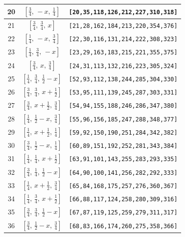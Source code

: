 \documentclass[fleqn,8pt]{jsarticle}
\begin{document}
\begin{longtable}{ccc}
20 & $\left[ \frac{3}{4},\, - x,\, \frac{1}{4} \right]$ & {\tt [20,35,118,126,212,227,310,318]} \\ \hline
21 & $\left[ \frac{3}{4},\, \frac{3}{4},\, x \right]$ & {\tt [21,28,162,184,213,220,354,376]} \\ \hline
22 & $\left[ \frac{1}{4},\, - x,\, \frac{3}{4} \right]$ & {\tt [22,30,116,131,214,222,308,323]} \\ \hline
23 & $\left[ \frac{1}{4},\, \frac{3}{4},\, - x \right]$ & {\tt [23,29,163,183,215,221,355,375]} \\ \hline
24 & $\left[ \frac{3}{4},\, x,\, \frac{3}{4} \right]$ & {\tt [24,31,113,132,216,223,305,324]} \\ \hline
25 & $\left[ \frac{1}{4},\, \frac{3}{4},\, \frac{1}{2} - x \right]$ & {\tt [52,93,112,138,244,285,304,330]} \\ \hline
26 & $\left[ \frac{3}{4},\, \frac{3}{4},\, x + \frac{1}{2} \right]$ & {\tt [53,95,111,139,245,287,303,331]} \\ \hline
27 & $\left[ \frac{3}{4},\, x + \frac{1}{2},\, \frac{3}{4} \right]$ & {\tt [54,94,155,188,246,286,347,380]} \\ \hline
28 & $\left[ \frac{1}{4},\, \frac{1}{2} - x,\, \frac{3}{4} \right]$ & {\tt [55,96,156,185,247,288,348,377]} \\ \hline
29 & $\left[ \frac{1}{4},\, x + \frac{1}{2},\, \frac{1}{4} \right]$ & {\tt [59,92,150,190,251,284,342,382]} \\ \hline
30 & $\left[ \frac{3}{4},\, \frac{1}{2} - x,\, \frac{1}{4} \right]$ & {\tt [60,89,151,192,252,281,343,384]} \\ \hline
31 & $\left[ \frac{1}{4},\, \frac{1}{4},\, x + \frac{1}{2} \right]$ & {\tt [63,91,101,143,255,283,293,335]} \\ \hline
32 & $\left[ \frac{3}{4},\, \frac{1}{4},\, \frac{1}{2} - x \right]$ & {\tt [64,90,100,141,256,282,292,333]} \\ \hline
33 & $\left[ \frac{1}{4},\, x + \frac{1}{2},\, \frac{3}{4} \right]$ & {\tt [65,84,168,175,257,276,360,367]} \\ \hline
34 & $\left[ \frac{1}{4},\, \frac{3}{4},\, x + \frac{1}{2} \right]$ & {\tt [66,88,117,124,258,280,309,316]} \\ \hline
35 & $\left[ \frac{3}{4},\, \frac{3}{4},\, \frac{1}{2} - x \right]$ & {\tt [67,87,119,125,259,279,311,317]} \\ \hline
36 & $\left[ \frac{3}{4},\, \frac{1}{2} - x,\, \frac{3}{4} \right]$ & {\tt [68,83,166,174,260,275,358,366]} \\ \hline

\end{longtable}
\end{document}
